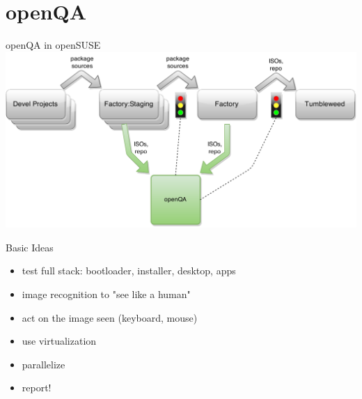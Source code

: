 \documentclass[
]{beamer}
\begin{document}

\section{openQA}

\begin{frame}{openQA in openSUSE}
  \includegraphics[width=.8\paperwidth]{openqa_in_devel_workflow}
\end{frame}

\begin{frame}{Basic Ideas}
  \begin{itemize}
    \item test full stack: bootloader, installer, desktop, apps
    \item image recognition to "see like a human"
    \item act on the image seen (keyboard, mouse)
    \item use virtualization
    \item parallelize
    \item report!
  \end{itemize}
\end{frame}
\end{document}
